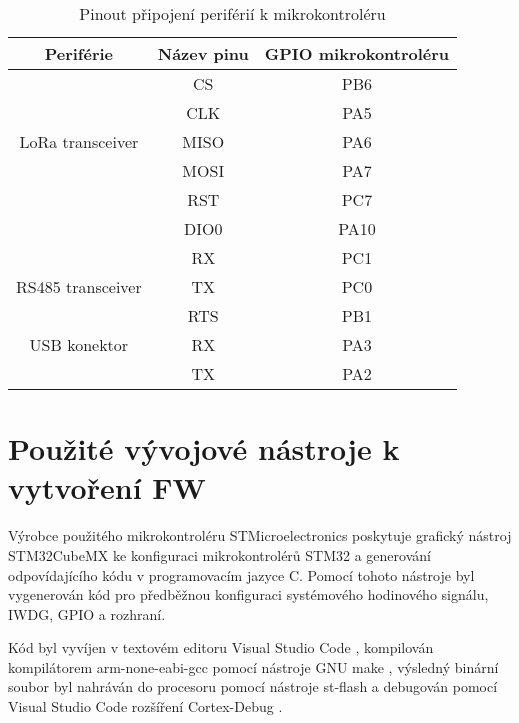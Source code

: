 \begin{longtable}{ |c|c|c| }

                \caption{Pinout připojení periférií k mikrokontroléru}
                \label{table:Pinout připojení periférií k mikrokontroléru} \\
     \hline

     Periférie          & Název pinu & GPIO mikrokontroléru           \\ \hline \hline

                        & CS    &  PB6             \\
                        & CLK   &  PA5        \\
    LoRa transceiver    & MISO  &  PA6     \\
                        & MOSI  &  PA7        \\
                        & RST   & PC7          \\
                        & DIO0  & PA10         \\
                        \hline
     
                        & RX  &   PC1            \\
    RS485 transceiver   & TX  &   PC0       \\
                        & RTS  &  PB1      \\     \hline

    USB konektor        & RX    & PA3    \\
                        & TX    & PA2   \\          \hline


\end{longtable}



\section{Použité vývojové nástroje k vytvoření FW}
Výrobce použitého mikrokontroléru STMicroelectronics poskytuje grafický nástroj STM32CubeMX \cite{stm32cubemx} ke konfiguraci mikrokontrolérů STM32 a generování odpovídajícího kódu v programovacím jazyce C.
Pomocí tohoto nástroje byl vygenerován kód pro předběžnou konfiguraci systémového hodinového signálu, IWDG, GPIO a rozhraní.

Kód byl vyvíjen v textovém editoru Visual Studio Code \cite{vscode}, kompilován kompilátorem arm-none-eabi-gcc \cite{arm-none-eabi-gcc} pomocí nástroje GNU make \cite{makefile}, výsledný binární soubor byl nahráván do procesoru pomocí nástroje st-flash \cite{st-flash} a debugován pomocí Visual Studio Code rozšíření Cortex-Debug \cite{cortex-debug}.


